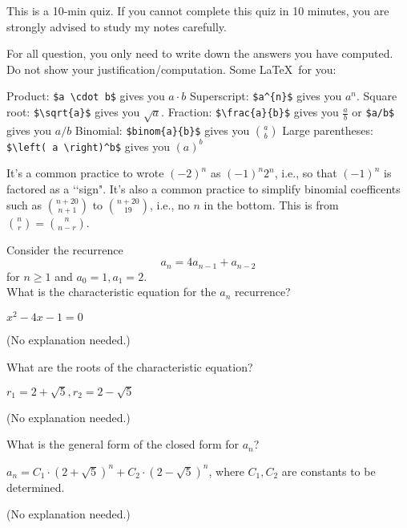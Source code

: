 

\renewcommand\AUTHOR{nweadick1@cougars.ccis.edu} %


\topmattertwo

This is a 10-min quiz.
If you cannot complete this quiz in 10 minutes, you are strongly
advised to study my notes carefully.

For all question, you only need to write down the answers you have
computed. Do not show your justification/computation.
Some \LaTeX\ for you:
\begin{enumerate}[nosep]
\li Product: \verb!$a \cdot b$! gives you $a \cdot b$
\li Superscript: \verb!$a^{n}$! gives you $a^{n}$.
\li Square root: \verb!$\sqrt{a}$! gives you $\sqrt{a}$.
\li Fraction: \verb!$\frac{a}{b}$! gives you $\frac{a}{b}$ or
\verb!$a/b$! gives you $a/b$ 
\li Binomial: \verb!$binom{a}{b}$! gives you $\binom{a}{b}$
\li Large parentheses:
\verb!$\left( a \right)^b$! gives you $\left( a \right)^b$ 
\end{enumerate}
It's a common practice to wrote $(-2)^n$ as $(-1)^n 2^n$, i.e.,
so that $(-1)^n$ is factored as a \lq\lq sign".
It's also a common practice to simplify binomial coefficents
such as $\binom{n + 20}{n + 1}$ to
$\binom{n + 20}{19}$,
i.e., no $n$ in the bottom.
This is from $\binom{n}{r} = \binom{n}{n - r}$.

Consider the recurrence
\[
a_n = 4a_{n-1} + a_{n-2}
\]
for $n \geq 1$ and $a_0 = 1, a_1 = 2$.
\\

\nextq
What is the characteristic equation for the $a_n$ recurrence?
\\
\ANSWER
\begin{answerlong}
$ x^2-4x-1 = 0 $
\end{answerlong}
(No explanation needed.)

\nextq
What are the roots of the characteristic equation?
\\
\ANSWER
\begin{answerlong}
$r_1 = 2+\sqrt{5}, r_2 = 2-\sqrt{5}$
\end{answerlong}
(No explanation needed.)

\nextq
What is the general form of the closed form for $a_n$?
\\
\ANSWER
\begin{answerlong}
$a_n = C_1 \cdot (2+\sqrt{5})^n + C_2 \cdot (2-\sqrt{5})^n$, where $C_1, C_2$ are constants to be determined.
\end{answerlong}
(No explanation needed.)

